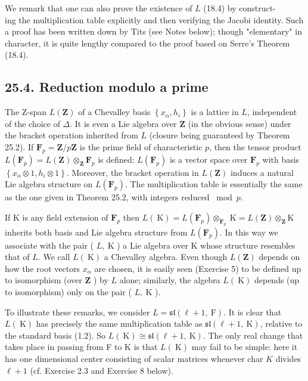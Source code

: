 \documentclass[10pt]{article}
\begin{document}
We remark that one can also prove the existence of $L$ (18.4) by construct-\\
ing the multiplication table explicitly and then verifying the Jacobi identity. Such a proof has been written down by Tits (see Notes below); though "elementary" in character, it is quite lengthy compared to the proof based on Serre's Theorem (18.4).

\subsection*{25.4. Reduction modulo a prime}
The Z-span $L(\mathbf{Z})$ of a Chevalley basis $\left\{x_{\alpha}, h_{i}\right\}$ is a lattice in $L$, independent of the choice of $\Delta$. It is even a Lie algebra over $\mathbf{Z}$ (in the obvious sense) under the bracket operation inherited from $L$ (closure being guaranteed by Theorem 25.2). If $\mathbf{F}_{p}=\mathbf{Z} / p \mathbf{Z}$ is the prime field of characteristic $p$, then the tensor product $L\left(\mathbf{F}_{p}\right)=L(\mathbf{Z}) \otimes_{\mathbf{Z}} \mathbf{F}_{p}$ is defined: $L\left(\mathbf{F}_{p}\right)$ is a vector space over $\mathbf{F}_{p}$ with basis $\left\{x_{\alpha} \otimes 1, h_{i} \otimes 1\right\}$. Moreover, the bracket operation in $L(\mathbf{Z})$ induces a natural Lie algebra structure on $L\left(\mathbf{F}_{p}\right)$. The multiplication table is essentially the same as the one given in Theorem 25.2, with integers reduced $\bmod p$.

If K is any field extension of $\mathbf{F}_{p}$ then $L(\mathrm{~K})=L\left(\mathbf{F}_{p}\right) \otimes_{\mathbf{F}_{p}} \mathrm{~K}=L(\mathbf{Z}) \otimes_{\mathbf{Z}} \mathrm{K}$ inherits both basis and Lie algebra structure from $L\left(\mathbf{F}_{p}\right)$. In this way we associate with the pair ( $L, \mathrm{~K}$ ) a Lie algebra over K whose structure resembles that of $L$. We call $L(\mathrm{~K})$ a Chevalley algebra. Even though $L(\mathbf{Z})$ depends on how the root vectors $x_{\alpha}$ are chosen, it is easily seen (Exercise 5) to be defined up to isomorphism (over $\mathbf{Z}$ ) by $L$ alone; similarly, the algebra $L(\mathrm{~K})$ depends (up to isomorphism) only on the pair ( $L, \mathrm{~K}$ ).

To illustrate these remarks, we consider $L=\mathfrak{s l}(\ell+1, \mathrm{~F})$. It is clear that $L(\mathrm{~K})$ has precisely the same multiplication table as $\mathfrak{s l}(\ell+1, \mathrm{~K})$, relative to the standard basis (1.2). So $L(\mathrm{~K}) \cong \mathfrak{s l}(\ell+1, \mathrm{~K})$. The only real change that takes place in passing from F to K is that $L(\mathrm{~K})$ may fail to be simple: here it has one dimensional center consisting of scalar matrices whenever char $K$ divides $\ell+1$ (cf. Exercise 2.3 and Exercise 8 below).
\end{document}
